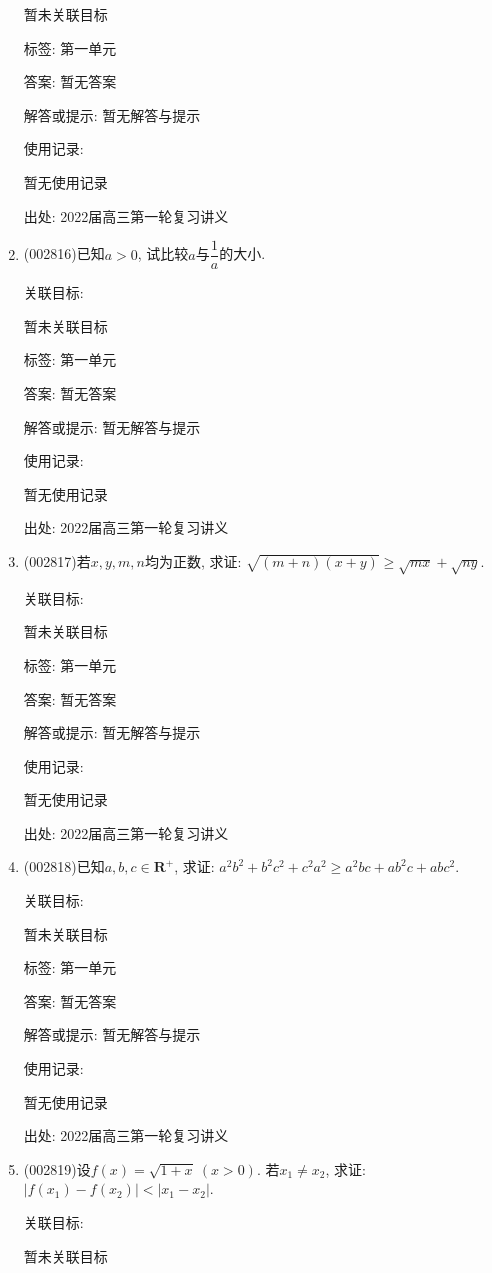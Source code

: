 \documentclass[10pt,a4paper]{article}
\begin{document}
\begin{enumerate}[1.]
暂未关联目标



标签: 第一单元

答案: 暂无答案

解答或提示: 暂无解答与提示

使用记录:

暂无使用记录


出处: 2022届高三第一轮复习讲义
\item { (002816)}已知$a>0$, 试比较$a$与$\dfrac 1a$的大小.


关联目标:

暂未关联目标



标签: 第一单元

答案: 暂无答案

解答或提示: 暂无解答与提示

使用记录:

暂无使用记录


出处: 2022届高三第一轮复习讲义
\item { (002817)}若$x,y,m,n$均为正数, 求证: $\sqrt{(m+n)(x+y)}\ge \sqrt{mx}+\sqrt{ny}$.


关联目标:

暂未关联目标



标签: 第一单元

答案: 暂无答案

解答或提示: 暂无解答与提示

使用记录:

暂无使用记录


出处: 2022届高三第一轮复习讲义
\item { (002818)}已知$a,b,c\in \mathbf{R}^+$, 求证: $a^2b^2+b^2c^2+c^2a^2\ge a^2bc+ab^2c+abc^2$.


关联目标:

暂未关联目标



标签: 第一单元

答案: 暂无答案

解答或提示: 暂无解答与提示

使用记录:

暂无使用记录


出处: 2022届高三第一轮复习讲义
\item { (002819)}设$f(x)=\sqrt{1+x}\ (x>0)$. 若$x_1\ne x_2$, 求证: $|f(x_1)-f(x_2)|<|x_1-x_2|$.


关联目标:

暂未关联目标




\end{enumerate}
\end{document}
